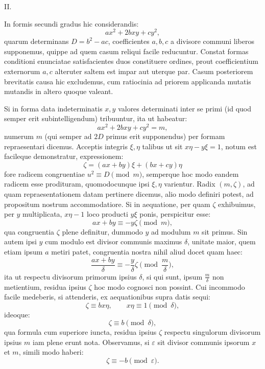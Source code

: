\documentclass[11pt]{article}
\begin{document}
\begin{center}II.\end{center}

In formis secundi gradus hic considerandis:
\[
 ax^2+2bxy+cy^2,
\]
quarum determinans $D=b^2-ac$, coefficientes $a,b,c$ a divisore communi liberos supponemus, quippe ad quem casum reliqui facile reducuntur. Constat formas conditioni enunciatae satisfacientes duos constituere ordines, prout coefficientium externorum $a,c$ alteruter saltem est impar aut uterque par. Casum posteriorem brevitatis causa hic excludemus, cum ratiocinia ad priorem applicanda mutatis mutandis in altero quoque valeant.

Si in forma data indeterminatis $x,y$ valores determinati inter se primi (id quod semper erit subintelligendum) tribuuntur, ita ut habeatur:
\[
 ax^2+2bxy+cy^2=m,
\]
numerum $m$ (qui semper ad $2D$ primus erit supponendus) per formam repraesentari dicemus. Acceptis integris $\xi,\eta$ talibus ut sit $x\eta-y\xi=1$, notum est facileque demonstratur, expressionem:
\[
 \zeta=(ax+by)\xi+(bx+cy)\eta
\]
fore radicem congruentiae $u^2\equiv D\pmod m$, semperque hoc modo eandem radicem esse prodituram, quomodocunque ipsi $\xi,\eta$ varientur. Radix $(m,\zeta)$, ad quam repraesentationem datam pertinere dicemus, alio modo definiri potest, ad propositum nostrum accommodatiore. Si in aequatione, per quam $\zeta$ exhibuimus, per $y$ multiplicata, $x\eta-1$ loco producti $y\xi$ ponis, perspicitur esse:
\begin{equation}\tag{1}
 ax+by\equiv -y\zeta \pmod m,
\end{equation}
qua congruentia $\zeta$ plene definitur, dummodo $y$ ad modulum $m$ sit primus. Sin autem ipsi $y$ cum modulo est divisor communis maximus $\delta$, unitate maior, quem etiam ipsum $a$ metiri patet, congruentia nostra nihil aliud docet quam haec:
\[
 \frac{ax+by}{\delta}\equiv -\frac{y}{\delta}\zeta\pmod {\frac m\delta},
\]
ita ut respectu divisorum primorum ipsius $\delta$, si qui sunt, ipsum $\frac m\delta$ non metientium, residua ipsius $\zeta$ hoc modo cognosci non possint. Cui incommodo facile medeberis, si attenderis, ex aequationibus supra datis sequi:
\[
 \zeta\equiv bx\eta,\qquad x\eta\equiv 1\pmod\delta,
\]
ideoque:
\begin{equation}\tag{2}
 \zeta\equiv b\pmod\delta,
\end{equation}
qua formula cum superiore iuncta, residua ipsius $\zeta$ respectu singulorum divisorum ipsius $m$ iam plene erunt nota. Observamus, si $\varepsilon$ sit divisor communis ipsorum $x$ et $m$, simili modo haberi:
\begin{equation}\tag{3}
 \zeta\equiv -b\pmod\varepsilon.
\end{equation}
\end{document}
